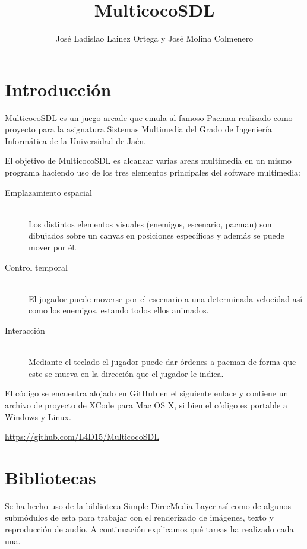 \documentclass[parskip=half*]{scrartcl}
\title{MulticocoSDL}
\author{Jos\'e Ladislao Lainez Ortega y Jos\'e Molina Colmenero}
\begin{document}
\maketitle
\vfill
\tableofcontents
\newpage

\section{Introducci\'on}
MulticocoSDL es un juego arcade que emula al famoso Pacman realizado como proyecto para la asignatura Sistemas Multimedia del Grado de Ingenier\'ia Inform\'atica de la Universidad de Ja\'en.

El objetivo de MulticocoSDL es alcanzar varias areas multimedia en un mismo programa haciendo uso de los tres elementos principales del software multimedia:

\begin{description}
	\item[Emplazamiento espacial]	\hfill \\	Los distintos elementos visuales (enemigos, escenario, pacman) son dibujados sobre un canvas en posiciones específicas y además se puede mover por él.
	\item[Control temporal] 		\hfill \\	El jugador puede moverse por el escenario a una determinada velocidad así como los enemigos, estando todos ellos animados.
	\item[Interacci\'on]			\hfill \\	Mediante el teclado el jugador puede dar \'ordenes a pacman de forma que este se mueva en la direcci\'on que el jugador le indica.
\end{description}

El c\'odigo se encuentra alojado en GitHub en el siguiente enlace y contiene un archivo de proyecto de XCode para Mac OS X, si bien el c\'odigo es portable a Windows y Linux. \\

\centerline{\url{https://github.com/L4D15/MulticocoSDL}}


\newpage
\section{Bibliotecas}
Se ha hecho uso de la biblioteca Simple DirecMedia Layer as\'i como de algunos subm\'odulos de esta para trabajar con el renderizado de im\'agenes, texto y reproducci\'on de audio. A continuaci\'on explicamos qu\'e tareas ha realizado cada una.
\end{document}
